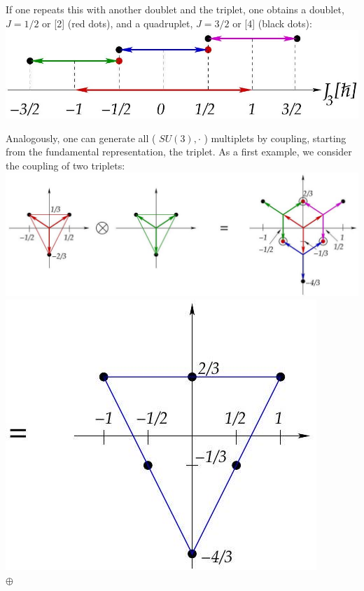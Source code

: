 \documentclass[10pt, letterpaper]{article}
\begin{document}
If one repeats this with another doublet and the triplet, one obtains a doublet, $J=1 / 2$ or [2] (red dots), and a quadruplet, $J=3 / 2$ or [4] (black dots):\\
\includegraphics[scale=0.3, center]{2025_05_20_8618f55a41bfe980b4b2g-54(2)}

Analogously, one can generate all ( $S U(3), \cdot$ ) multiplets by coupling, starting from the fundamental representation, the triplet. As a first example, we consider the coupling of two triplets:\\
\includegraphics[scale=0.3, center]{2025_05_20_8618f55a41bfe980b4b2g-54(4)}\\
\includegraphics[scale=0.3, center]{2025_05_20_8618f55a41bfe980b4b2g-54(5)}\\
$\oplus$\\
\end{document}
